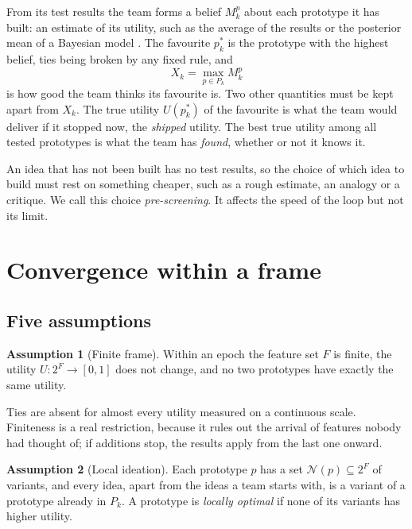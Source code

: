 \documentclass[preprint,review,11pt,authoryear]{elsarticle}
\newcommand{\Nb}{\mathcal{N}}
\newcommand{\Pk}{P_k}
\theoremstyle{definition}
\newtheorem{assumption}{Assumption}
\begin{document}
From its test results the team forms a belief $M^p_k$ about each prototype it has built: an estimate of its utility, such as the average of the results or the posterior mean of a Bayesian model \citep{degroot2004}. The favourite $p^*_k$ is the prototype with the highest belief, ties being broken by any fixed rule, and
\begin{equation}
\label{eq:Xk}
X_k=\max_{p\in \Pk}M^p_k
\end{equation}
is how good the team thinks its favourite is. Two other quantities must be kept apart from $X_k$. The true utility $U(p^*_k)$ of the favourite is what the team would deliver if it stopped now, the \emph{shipped} utility. The best true utility among all tested prototypes is what the team has \emph{found}, whether or not it knows it.

An idea that has not been built has no test results, so the choice of which idea to build must rest on something cheaper, such as a rough estimate, an analogy or a critique. We call this choice \emph{pre-screening}. It affects the speed of the loop but not its limit.

\section{Convergence within a frame}
\label{sec:theory}

\subsection{Five assumptions}

\begin{assumption}[Finite frame]
\label{as:finite}
Within an epoch the feature set $F$ is finite, the utility $U:2^F\to[0,1]$ does not change, and no two prototypes have exactly the same utility.
\end{assumption}

Ties are absent for almost every utility measured on a continuous scale. Finiteness is a real restriction, because it rules out the arrival of features nobody had thought of; if additions stop, the results apply from the last one onward.

\begin{assumption}[Local ideation]
\label{as:local}
Each prototype $p$ has a set $\Nb(p)\subseteq 2^F$ of variants, and every idea, apart from the ideas a team starts with, is a variant of a prototype already in $\Pk$. A prototype is \emph{locally optimal} if none of its variants has higher utility.
\end{assumption}
\end{document}
